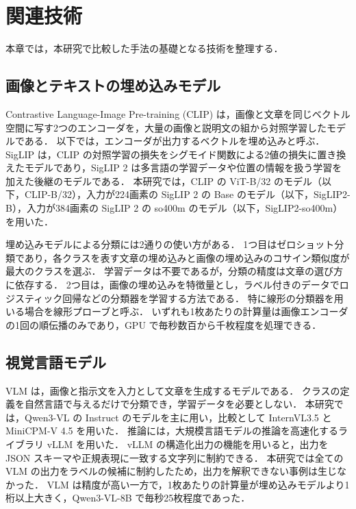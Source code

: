 \section{関連技術}
\label{sec_related}
本章では，本研究で比較した手法の基礎となる技術を整理する．

\subsection{画像とテキストの埋め込みモデル}
Contrastive Language-Image Pre-training (CLIP)\cite{ref_clip} は，画像と文章を同じベクトル空間に写す2つのエンコーダを，大量の画像と説明文の組から対照学習したモデルである．
以下では，エンコーダが出力するベクトルを埋め込みと呼ぶ．
SigLIP\cite{ref_siglip} は，CLIP の対照学習の損失をシグモイド関数による2値の損失に置き換えたモデルであり，SigLIP 2\cite{ref_siglip2} は多言語の学習データや位置の情報を扱う学習を加えた後継のモデルである．
本研究では，CLIP の ViT-B/32 のモデル（以下，CLIP-B/32），入力が224画素の SigLIP 2 の Base のモデル（以下，SigLIP2-B），入力が384画素の SigLIP 2 の so400m のモデル（以下，SigLIP2-so400m）を用いた．

埋め込みモデルによる分類には2通りの使い方がある．
1つ目はゼロショット分類であり，各クラスを表す文章の埋め込みと画像の埋め込みのコサイン類似度が最大のクラスを選ぶ．
学習データは不要であるが，分類の精度は文章の選び方に依存する．
2つ目は，画像の埋め込みを特徴量とし，ラベル付きのデータでロジスティック回帰などの分類器を学習する方法である．
特に線形の分類器を用いる場合を線形プローブと呼ぶ．
いずれも1枚あたりの計算量は画像エンコーダの1回の順伝播のみであり，GPU で毎秒数百から千枚程度を処理できる．

\subsection{視覚言語モデル}
VLM は，画像と指示文を入力として文章を生成するモデルである．
クラスの定義を自然言語で与えるだけで分類でき，学習データを必要としない．
本研究では，Qwen3-VL\cite{ref_qwen3vl} の Instruct のモデルを主に用い，比較として InternVL3.5\cite{ref_internvl35} と MiniCPM-V 4.5\cite{ref_minicpmv} を用いた．
推論には，大規模言語モデルの推論を高速化するライブラリ vLLM\cite{ref_vllm} を用いた．
vLLM の構造化出力の機能を用いると，出力を JSON スキーマや正規表現に一致する文字列に制約できる．
本研究では全ての VLM の出力をラベルの候補に制約したため，出力を解釈できない事例は生じなかった．
VLM は精度が高い一方で，1枚あたりの計算量が埋め込みモデルより1桁以上大きく，Qwen3-VL-8B で毎秒25枚程度であった．

